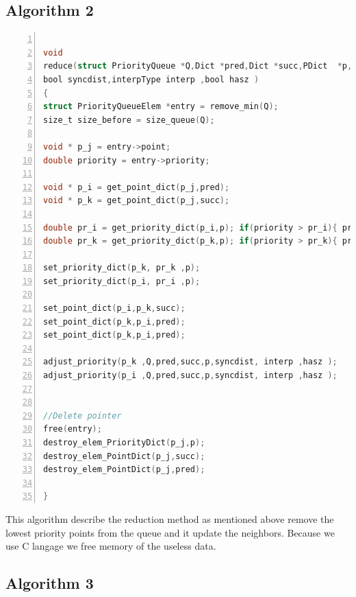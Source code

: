 \subsection{Algorithm 2}
\begin{lstlisting}[language=C, % Spécifie le langage du code
caption={reduce}, % Légende du listing
label=lst:reduce_c, % Étiquette pour référencer le listing
numbers=left,
numberstyle=\tiny\color{gray},
stepnumber=1,
frame=single,
breaklines=true,
postbreak=\mbox{\textcolor{red}{$\hookrightarrow$}\space},
showstringspaces=false
]

void
reduce(struct PriorityQueue *Q,Dict *pred,Dict *succ,PDict  *p,
bool syncdist,interpType interp ,bool hasz )
{
struct PriorityQueueElem *entry = remove_min(Q);
size_t size_before = size_queue(Q);

void * p_j = entry->point;
double priority = entry->priority;

void * p_i = get_point_dict(p_j,pred);
void * p_k = get_point_dict(p_j,succ);

double pr_i = get_priority_dict(p_i,p); if(priority > pr_i){ pr_i = priority; }
double pr_k = get_priority_dict(p_k,p); if(priority > pr_k){ pr_k = priority; }

set_priority_dict(p_k, pr_k ,p);
set_priority_dict(p_i, pr_i ,p);

set_point_dict(p_i,p_k,succ);
set_point_dict(p_k,p_i,pred);
set_point_dict(p_k,p_i,pred);

adjust_priority(p_k ,Q,pred,succ,p,syncdist, interp ,hasz );
adjust_priority(p_i ,Q,pred,succ,p,syncdist, interp ,hasz );


//Delete pointer
free(entry);
destroy_elem_PriorityDict(p_j,p);
destroy_elem_PointDict(p_j,succ);
destroy_elem_PointDict(p_j,pred);

}

\end{lstlisting}

This algorithm describe the reduction method as mentioned above remove the lowest priority points from the queue and it update the neighbors. Because we use C langage we free memory of the useless data.

\subsection{Algorithm 3}


